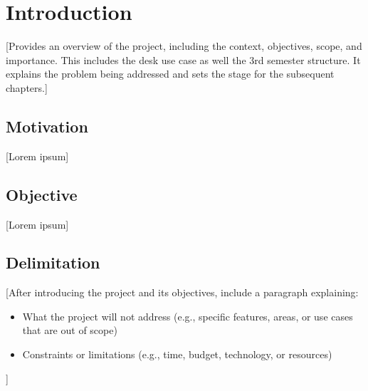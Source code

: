 \chapter{Introduction}
\label{chap:introduction}

[Provides an overview of the project, including the context, objectives, scope, and importance. This includes the desk use case as well the 3rd semester structure. It explains the problem being addressed and sets the stage for the subsequent chapters.]

\section{Motivation}
\label{sec:motivation}
[Lorem ipsum]

\section{Objective}
\label{sec:objective}
[Lorem ipsum]

\section{Delimitation}
\label{sec:delimitation}
[After introducing the project and its objectives, include a paragraph explaining:
\begin{itemize}
    \item What the project will not address (e.g., specific features, areas, or use cases that are out of scope)
    \item Constraints or limitations (e.g., time, budget, technology, or resources)
\end{itemize}]

